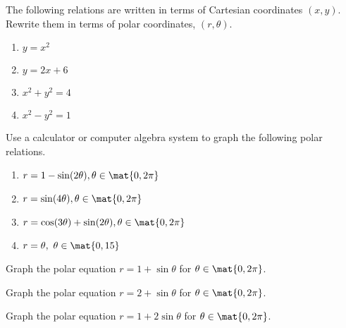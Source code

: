 \begin{ex} The following relations are written in terms of Cartesian coordinates $(x, y)$. Rewrite them in terms of polar coordinates, $(r, \theta)$. 

\begin{enumerate}
\item $y=x^{2}$

\item $y=2x+6$

\item $x^{2}+y^{2}=4$

\item $x^{2}-y^{2}=1$
\end{enumerate}
\end{ex}

\begin{ex} Use a calculator or computer algebra system to graph the following
polar relations.

\begin{enumerate}
\item $r=1-\sin (2\theta) ,\theta \in \mat{0,2\pi} $

\item $r=\sin (4\theta) ,\theta \in \mat{0,2\pi} $ 

\item $r=\cos (3\theta) +\sin (2\theta) ,\theta
\in \mat{0,2\pi} $

\item $r=\theta ,\ \theta \in \mat{0,15} $
\end{enumerate}
\end{ex}

\begin{ex} Graph the polar equation $r=1+\sin \theta $ for $\theta \in \mat{0,2\pi}$.
\end{ex}

\begin{ex} Graph the polar equation $r=2+\sin \theta $ for $\theta \in \mat{0,2\pi}$.
\end{ex}

\begin{ex} Graph the polar equation $r=1+2\sin \theta $ for $\theta \in \mat{0,2\pi}$.
\end{ex}


